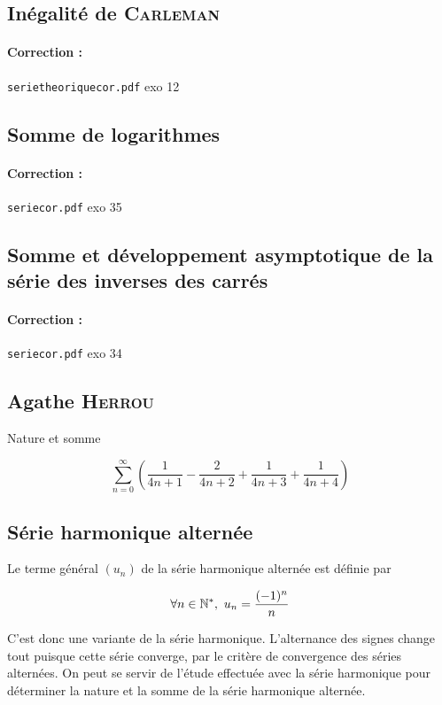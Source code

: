 \subsection{Inégalité de \textsc{Carleman}}

\paragraph{Correction : } \texttt{serietheoriquecor.pdf} exo 12

\subsection{Somme de logarithmes}


\paragraph{Correction : } \texttt{seriecor.pdf} exo 35


\subsection{Somme et développement asymptotique de la série des inverses des carrés}

\paragraph{Correction : } \texttt{seriecor.pdf} exo 34

\subsection{Agathe \textsc{Herrou}}

Nature et somme

$$
    \sum_{n=0}^{\infty} \left(\frac{1}{4n+1} - \frac{2}{4n+2} + \frac{1}{4n+3} + \frac{1}{4n+4}\right)
$$

\subsection{Série harmonique alternée}

Le terme général $(u_n)$ de la série harmonique alternée est définie par

\[
    \forall n \in \NN^*,\ u_n=\frac{(-1)^n}{n}
\]

C'est donc une variante de la série harmonique. L'alternance des signes change tout puisque cette série converge, par le critère de convergence des séries alternées. On peut se servir de l'étude effectuée avec la série harmonique pour déterminer la nature et la somme de la série harmonique alternée.

